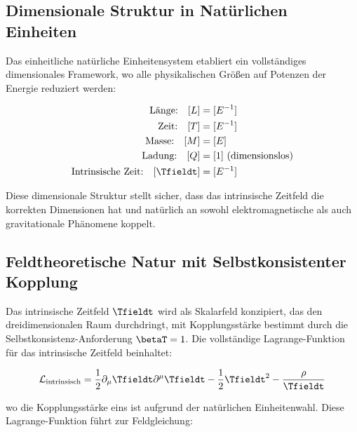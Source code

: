 	\subsection{Dimensionale Struktur in Natürlichen Einheiten}
	\label{subsec:dimensional_structure}
	
	Das einheitliche natürliche Einheitensystem etabliert ein vollständiges dimensionales Framework, wo alle physikalischen Größen auf Potenzen der Energie reduziert werden:
	
	\begin{tcolorbox}[colback=blue!5!white,colframe=blue!75!black,title=Dimensionale Struktur Einheitlicher Natürlicher Einheiten]
		\begin{align}
			\text{Länge:} \quad [L] &= [E^{-1}] \nonumber\\
			\text{Zeit:} \quad [T] &= [E^{-1}] \nonumber\\
			\text{Masse:} \quad [M] &= [E] \nonumber\\
			\text{Ladung:} \quad [Q] &= [1] \text{ (dimensionslos)} \nonumber\\
			\text{Intrinsische Zeit:} \quad [\Tfieldt] &= [E^{-1}] \nonumber
		\end{align}
	\end{tcolorbox}
	
	Diese dimensionale Struktur stellt sicher, dass das intrinsische Zeitfeld die korrekten Dimensionen hat und natürlich an sowohl elektromagnetische als auch gravitationale Phänomene koppelt.
	
	\subsection{Feldtheoretische Natur mit Selbstkonsistenter Kopplung}
	\label{subsec:field_theoretic_self_consistent}
	
	Das intrinsische Zeitfeld $\Tfieldt$ wird als Skalarfeld konzipiert, das den dreidimensionalen Raum durchdringt, mit Kopplungsstärke bestimmt durch die Selbstkonsistenz-Anforderung $\betaT = 1$. Die vollständige Lagrange-Funktion für das intrinsische Zeitfeld beinhaltet:
	
	\begin{equation}
		\mathcal{L}_{\text{intrinsisch}} = \frac{1}{2} \partial_\mu \Tfieldt \partial^\mu \Tfieldt - \frac{1}{2}\Tfieldt^2 - \frac{\rho}{\Tfieldt}
	\end{equation}
	
	wo die Kopplungsstärke eins ist aufgrund der natürlichen Einheitenwahl. Diese Lagrange-Funktion führt zur Feldgleichung:
	
